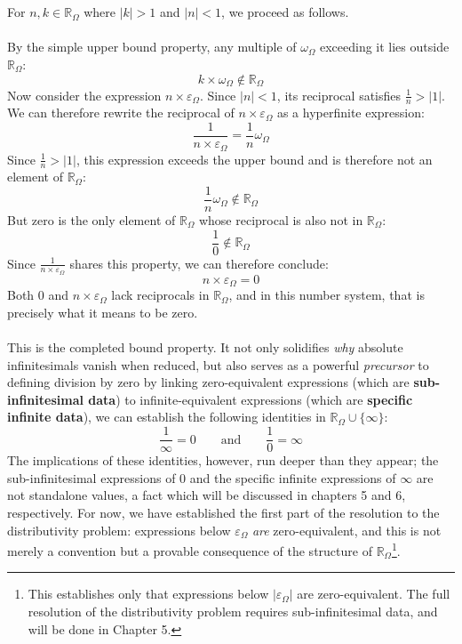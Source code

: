 \documentclass{article}
\begin{document}
\\\\For $n, k \in \mathbb{R}_\Omega$ where $|k| > 1$ and $|n| < 1$, we proceed as follows.\\\\
By the simple upper bound property, any multiple of $\omega_\Omega$ exceeding it lies outside $\mathbb{R}_\Omega$:
$$k \times \omega_\Omega \notin \mathbb{R}_\Omega$$
Now consider the expression $n \times \varepsilon_\Omega$. Since $|n| < 1$, its reciprocal satisfies $\frac{1}{n} > |1|$. We can therefore rewrite the reciprocal of $n \times \varepsilon_\Omega$ as a hyperfinite expression:
$$\frac{1}{n \times \varepsilon_\Omega} = \frac{1}{n}\omega_\Omega$$
Since $\frac{1}{n} > |1|$, this expression exceeds the upper bound and is therefore not an element of $\mathbb{R}_\Omega$:
$$\frac{1}{n}\omega_\Omega \notin \mathbb{R}_\Omega$$
But zero is the only element of $\mathbb{R}_\Omega$ whose reciprocal is also not in $\mathbb{R}_\Omega$:
$$\frac{1}{0} \notin \mathbb{R}_\Omega$$
Since $\frac{1}{n \times \varepsilon_\Omega}$ shares this property, we can therefore conclude:
$$n \times \varepsilon_\Omega = 0$$
Both $0$ and $n \times \varepsilon_\Omega$ lack reciprocals in $\mathbb{R}_\Omega$, and in this number system, that is precisely what it means to be zero.
\\\\This is the completed bound property. It not only solidifies \textit{why} absolute infinitesimals vanish when reduced, but also serves as a powerful \textit{precursor} to defining division by zero by linking zero-equivalent expressions (which are \textbf{sub-infinitesimal data}) to infinite-equivalent expressions (which are \textbf{specific infinite data}), we can establish the following identities in $\mathbb{R}_\Omega \cup \{\infty\}$:
$$\frac{1}{\infty} = 0 \qquad \text{and} \qquad \frac{1}{0} = \infty$$
The implications of these identities, however, run deeper than they appear; the sub-infinitesimal expressions of $0$ and the specific infinite expressions of $\infty$ are not standalone values, a fact which will be discussed in chapters 5 and 6, respectively. For now, we have established the first part of the resolution to the distributivity problem: expressions below $\varepsilon_\Omega$ \textit{are} zero-equivalent, and this is not merely a convention but a provable consequence of the structure of $\mathbb{R}_\Omega$\footnote{This establishes only that expressions below $|\varepsilon_\Omega|$ are zero-equivalent. The full resolution of the distributivity problem requires sub-infinitesimal data, and will be done in Chapter 5.}.
\newpage
\end{document}
